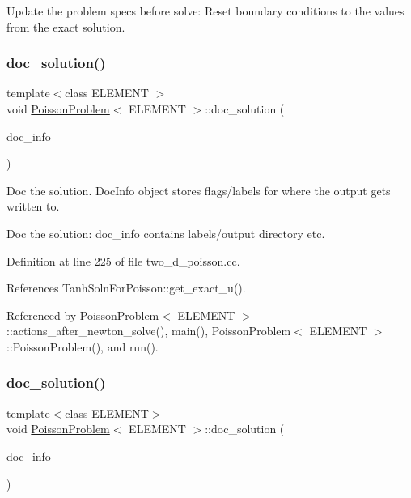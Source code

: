 Update the problem specs before solve\+: Reset boundary conditions to the values from the exact solution. 

\mbox{\label{classPoissonProblem_aab6f503fa242f687bb8452527bb7688f}} 
\subsubsection{\texorpdfstring{doc\+\_\+solution()}{doc\_solution()}\hspace{0.1cm}{\footnotesize\ttfamily [1/3]}}
{\footnotesize\ttfamily template$<$class E\+L\+E\+M\+E\+NT $>$ \\
void \hyperlink{classPoissonProblem}{Poisson\+Problem}$<$ E\+L\+E\+M\+E\+NT $>$\+::doc\+\_\+solution (\begin{DoxyParamCaption}\item[{Doc\+Info \&}]{doc\+\_\+info }\end{DoxyParamCaption})}



Doc the solution. Doc\+Info object stores flags/labels for where the output gets written to. 

Doc the solution\+: doc\+\_\+info contains labels/output directory etc. 

Definition at line 225 of file two\+\_\+d\+\_\+poisson.\+cc.



References Tanh\+Soln\+For\+Poisson\+::get\+\_\+exact\+\_\+u().



Referenced by Poisson\+Problem$<$ E\+L\+E\+M\+E\+N\+T $>$\+::actions\+\_\+after\+\_\+newton\+\_\+solve(), main(), Poisson\+Problem$<$ E\+L\+E\+M\+E\+N\+T $>$\+::\+Poisson\+Problem(), and run().

\mbox{\label{classPoissonProblem_aab6f503fa242f687bb8452527bb7688f}} 
\subsubsection{\texorpdfstring{doc\+\_\+solution()}{doc\_solution()}\hspace{0.1cm}{\footnotesize\ttfamily [2/3]}}
{\footnotesize\ttfamily template$<$class E\+L\+E\+M\+E\+NT$>$ \\
void \hyperlink{classPoissonProblem}{Poisson\+Problem}$<$ E\+L\+E\+M\+E\+NT $>$\+::doc\+\_\+solution (\begin{DoxyParamCaption}\item[{Doc\+Info \&}]{doc\+\_\+info }\end{DoxyParamCaption})}



